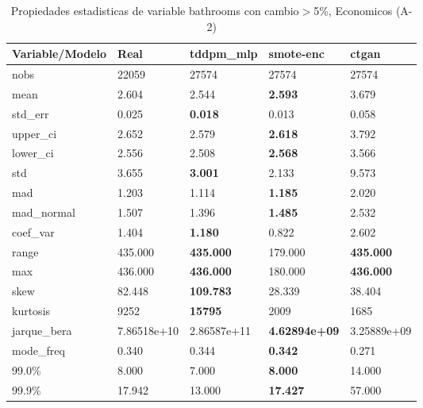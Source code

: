 \begin{table}[H]
\centering
\fontsize{8}{14}\selectfont
\caption{Propiedades estadisticas de variable bathrooms con cambio\ensuremath{>}5\%, Economicos (A-2)}
\label{table-stats-economicos-a-2-bathrooms-short}
\begin{tabular}{|l|m{10em}|m{10em}|m{10em}|m{10em}|}
\hline
 \rowcolor[gray]{0.8}
Variable/Modelo & Real & tddpm\_mlp & smote-enc & ctgan \\
\hline nobs & 22059 & 27574 & 27574 & 27574 \\
\hline mean & 2.604 & 2.544 & \bfseries 2.593 & \cellcolor[rgb]{0.9, 0.54, 0.52} 3.679 \\
\hline std\_err & 0.025 & \bfseries 0.018 & 0.013 & \cellcolor[rgb]{0.9, 0.54, 0.52} 0.058 \\
\hline upper\_ci & 2.652 & 2.579 & \bfseries 2.618 & \cellcolor[rgb]{0.9, 0.54, 0.52} 3.792 \\
\hline lower\_ci & 2.556 & 2.508 & \bfseries 2.568 & \cellcolor[rgb]{0.9, 0.54, 0.52} 3.566 \\
\hline std & 3.655 & \bfseries 3.001 & 2.133 & \cellcolor[rgb]{0.9, 0.54, 0.52} 9.573 \\
\hline mad & 1.203 & 1.114 & \bfseries 1.185 & \cellcolor[rgb]{0.9, 0.54, 0.52} 2.020 \\
\hline mad\_normal & 1.507 & 1.396 & \bfseries 1.485 & \cellcolor[rgb]{0.9, 0.54, 0.52} 2.532 \\
\hline coef\_var & 1.404 & \bfseries 1.180 & 0.822 & \cellcolor[rgb]{0.9, 0.54, 0.52} 2.602 \\
\hline range & 435.000 & \bfseries 435.000 & \cellcolor[rgb]{0.9, 0.54, 0.52} 179.000 & \bfseries 435.000 \\
\hline max & 436.000 & \bfseries 436.000 & \cellcolor[rgb]{0.9, 0.54, 0.52} 180.000 & \bfseries 436.000 \\
\hline skew & 82.448 & \bfseries 109.783 & \cellcolor[rgb]{0.9, 0.54, 0.52} 28.339 & 38.404 \\
\hline kurtosis & 9252 & \bfseries 15795 & 2009 & \cellcolor[rgb]{0.9, 0.54, 0.52} 1685 \\
\hline jarque\_bera & 7.86518e+10 & \cellcolor[rgb]{0.9, 0.54, 0.52} 2.86587e+11 & \bfseries 4.62894e+09 & 3.25889e+09 \\
\hline mode\_freq & 0.340 & 0.344 & \bfseries 0.342 & \cellcolor[rgb]{0.9, 0.54, 0.52} 0.271 \\
\hline 99.0\% & 8.000 & 7.000 & \bfseries 8.000 & \cellcolor[rgb]{0.9, 0.54, 0.52} 14.000 \\
\hline 99.9\% & 17.942 & 13.000 & \bfseries 17.427 & \cellcolor[rgb]{0.9, 0.54, 0.52} 57.000 \\
\hline
\end{tabular}
\end{table}
